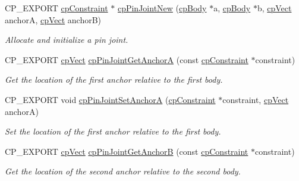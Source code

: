 \begin{DoxyCompactItemize}
\mbox{\label{group__cp_pin_joint_gaa5ed842c4d454ff0731dabc5aac2e154}} 
C\+P\+\_\+\+E\+X\+P\+O\+RT \mbox{\hyperlink{structcp_constraint}{cp\+Constraint}} $\ast$ \mbox{\hyperlink{group__cp_pin_joint_gaa5ed842c4d454ff0731dabc5aac2e154}{cp\+Pin\+Joint\+New}} (\mbox{\hyperlink{structcp_body}{cp\+Body}} $\ast$a, \mbox{\hyperlink{structcp_body}{cp\+Body}} $\ast$b, \mbox{\hyperlink{structcp_vect}{cp\+Vect}} anchorA, \mbox{\hyperlink{structcp_vect}{cp\+Vect}} anchorB)
\begin{DoxyCompactList}\small\item\em Allocate and initialize a pin joint. \end{DoxyCompactList}\item 
\mbox{\label{group__cp_pin_joint_gac7244e7bc4ad95d7ebecb692dc909e04}} 
C\+P\+\_\+\+E\+X\+P\+O\+RT \mbox{\hyperlink{structcp_vect}{cp\+Vect}} \mbox{\hyperlink{group__cp_pin_joint_gac7244e7bc4ad95d7ebecb692dc909e04}{cp\+Pin\+Joint\+Get\+AnchorA}} (const \mbox{\hyperlink{structcp_constraint}{cp\+Constraint}} $\ast$constraint)
\begin{DoxyCompactList}\small\item\em Get the location of the first anchor relative to the first body. \end{DoxyCompactList}\item 
\mbox{\label{group__cp_pin_joint_gace722d745a34b9cf1145bca66e075961}} 
C\+P\+\_\+\+E\+X\+P\+O\+RT void \mbox{\hyperlink{group__cp_pin_joint_gace722d745a34b9cf1145bca66e075961}{cp\+Pin\+Joint\+Set\+AnchorA}} (\mbox{\hyperlink{structcp_constraint}{cp\+Constraint}} $\ast$constraint, \mbox{\hyperlink{structcp_vect}{cp\+Vect}} anchorA)
\begin{DoxyCompactList}\small\item\em Set the location of the first anchor relative to the first body. \end{DoxyCompactList}\item 
\mbox{\label{group__cp_pin_joint_ga21a091a978025cf154fcea2ef19c39dc}} 
C\+P\+\_\+\+E\+X\+P\+O\+RT \mbox{\hyperlink{structcp_vect}{cp\+Vect}} \mbox{\hyperlink{group__cp_pin_joint_ga21a091a978025cf154fcea2ef19c39dc}{cp\+Pin\+Joint\+Get\+AnchorB}} (const \mbox{\hyperlink{structcp_constraint}{cp\+Constraint}} $\ast$constraint)
\begin{DoxyCompactList}\small\item\em Get the location of the second anchor relative to the second body. \end{DoxyCompactList}\item 

\end{DoxyCompactItemize}
